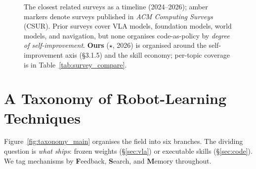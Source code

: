 \documentclass[acmsmall,screen,nonacm]{acmart}
\begin{document}
\begin{figure}[t]
{}
\caption{The closest related surveys as a timeline (2024--2026);
\textcolor{secD!55!black}{amber} markers denote surveys published in \emph{ACM Computing
Surveys} (CSUR). Prior surveys cover VLA models, foundation models, world models, and navigation,
but none organises code-as-policy by \emph{degree of self-improvement}. \textbf{Ours}
($\star$, 2026) is organised around the self-improvement axis (\S3.1.5) and the skill economy;
per-topic coverage is in Table~\ref{tab:survey_compare}.}
\label{fig:surveys}
\end{figure}
 \FloatBarrier
\section{A Taxonomy of Robot-Learning Techniques}
\label{sec:taxonomy}

Figure~\ref{fig:taxonomy_main} organises the field into six branches. The dividing
question is \emph{what ships}: frozen weights (\S\ref{sec:vla}) or executable skills
(\S\ref{sec:code}). We tag mechanisms by \textbf{F}eedback, \textbf{S}earch, and
\textbf{M}emory throughout.
\end{document}
